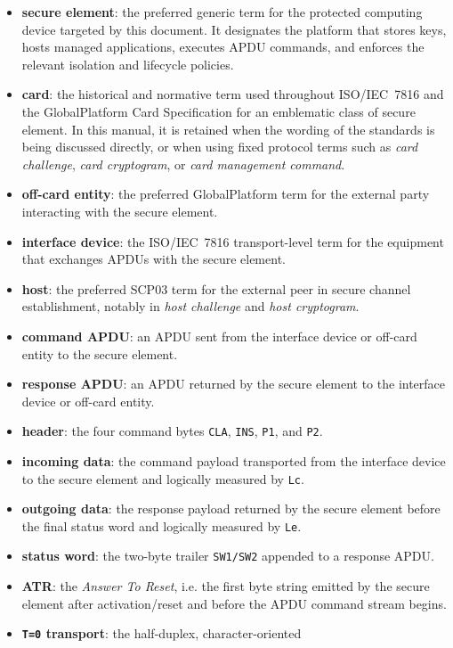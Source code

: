 \begin{itemize}
\item \textbf{secure element}: the preferred generic term for the protected
  computing device targeted by this document. It designates the platform that
  stores keys, hosts managed applications, executes APDU commands, and enforces
  the relevant isolation and lifecycle policies.
\item \textbf{card}: the historical and normative term used throughout
  ISO/IEC~7816 and the GlobalPlatform Card Specification for an emblematic
  class of secure element. In this manual, it is retained when the wording of
  the standards is being discussed directly, or when using fixed protocol terms
  such as \emph{card challenge}, \emph{card cryptogram}, or \emph{card
  management command}.
\item \textbf{off-card entity}: the preferred GlobalPlatform term for the
  external party interacting with the secure element.
\item \textbf{interface device}: the ISO/IEC~7816 transport-level term for the
  equipment that exchanges APDUs with the secure element.
\item \textbf{host}: the preferred SCP03 term for the external peer in secure
  channel establishment, notably in \emph{host challenge} and \emph{host
  cryptogram}.
\item \textbf{command APDU}: an APDU sent from the interface device or
  off-card entity to the secure element.
\item \textbf{response APDU}: an APDU returned by the secure element to the
  interface device or off-card entity.
\item \textbf{header}: the four command bytes \texttt{CLA}, \texttt{INS},
  \texttt{P1}, and \texttt{P2}.
\item \textbf{incoming data}: the command payload transported from the
  interface device to the secure element and logically measured by
  \texttt{Lc}.
\item \textbf{outgoing data}: the response payload returned by the secure
  element before the final status word and logically measured by \texttt{Le}.
\item \textbf{status word}: the two-byte trailer \texttt{SW1/SW2} appended to
  a response APDU.
\item \textbf{ATR}: the \emph{Answer To Reset}, i.e. the first byte string
  emitted by the secure element after activation/reset and before the APDU
  command stream begins.
\item \textbf{\texttt{T=0} transport}: the half-duplex, character-oriented

\end{itemize}
